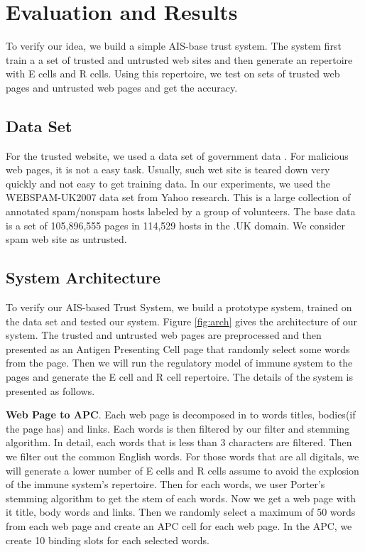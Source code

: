 \documentclass{llncs}
\begin{document}
\section{Evaluation and Results}
To verify our idea, we build a simple AIS-base trust system. The system first
train a a set of trusted and untrusted web sites and then generate an
repertoire with E cells and R cells. Using this repertoire, we test on sets of
trusted web pages and untrusted web pages and get the accuracy. 

\subsection{Data Set}
For the trusted website, we used a data set of government data \cite{WTX}. For
malicious web pages, it is not a easy task. Usually, such wet site is teared
down very quickly and not easy to get training data. In our experiments, we
used the WEBSPAM-UK2007 data set \cite{WEBSPAM-UK2007} from Yahoo research.
This is a large collection of annotated spam/nonspam hosts labeled by a group of volunteers. The base data is a set of 105,896,555 pages in 114,529 hosts in the .UK domain. We consider spam web site as untrusted. 

\subsection{System Architecture}
To verify our AIS-based Trust System, we build a prototype system, trained on the data set and tested our system. Figure \ref{fig:arch} gives the architecture of our system. The trusted and untrusted web pages are preprocessed and then presented as an Antigen Presenting Cell page that randomly select some words from the page. Then we will run the regulatory model of immune system to the pages and generate the E cell and R cell repertoire. The details of the system is presented as follows.

\textbf{Web Page to APC}. Each web page is decomposed in to words titles, bodies(if the page has) and links. Each words is then filtered by our filter and stemming algorithm\cite{Porter}. In detail, each words that is less than 3 characters are filtered. Then we filter out the common English words\cite{Common}. For those words that are all digitals, we will generate a lower number of E cells and R cells assume to avoid the explosion of the immune system's repertoire. Then for each words, we user Porter's stemming algorithm to get the stem of each words. Now we get a web page with it title, body words and links. Then we randomly select a maximum of 50 words from each web page and create an APC cell for each web page. In the APC, we create 10 binding slots for each selected words. 
\end{document}
